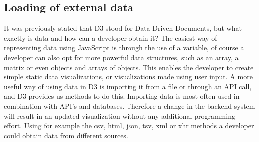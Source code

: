 \documentclass{bioinfo}
\begin{document}
\subsection{Loading of external data}
It was previously stated that D3 stood for Data Driven Documents, but what exactly is data and how can a developer obtain it? The easiest way of representing data using JavaScript is through the use of a variable, of course a developer can also opt for more powerful data structures, such as an array, a matrix or even objects and arrays of objects. This enables the developer to create simple static data visualizations, or visualizations made using user input. A more useful way of using data in D3 is importing it from a file or through an API call, and D3 provides us methods to do this.
Importing data is most often used in combination with API's and databases. Therefore a change in the backend system will result in an updated visualization without any additional programming effort.
Using for example the csv, html, json, tsv, xml or xhr methods a developer could obtain data from different sources.
\end{document}
